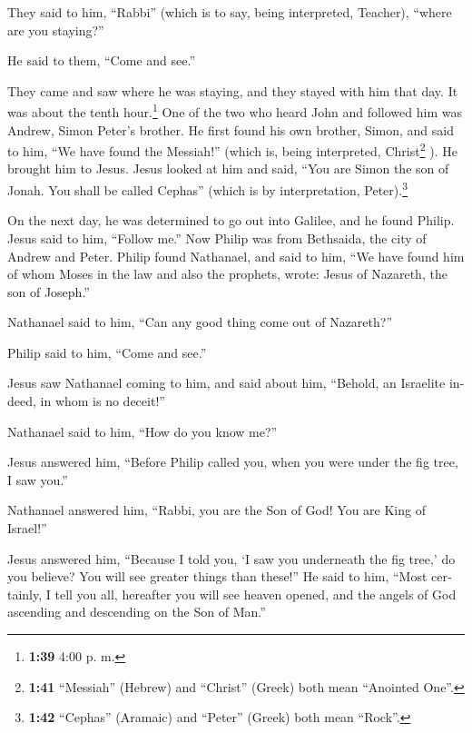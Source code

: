 \begin{paracol}{2}
\begin{otherlanguage}{english}
They said to him, ``Rabbi'' (which is to say, being interpreted,
Teacher), ``where are you staying?''

 He said to them, ``Come and see.''

They came and saw where he was staying, and they stayed with him that
day. It was about the tenth hour.\footnote{\textbf{1:39} 4:00 p. m.}
 One of the two who heard John and followed him was
Andrew, Simon Peter's brother.  He first found his own
brother, Simon, and said to him, ``We have found the Messiah!'' (which
is, being interpreted, Christ\footnote{\textbf{1:41} ``Messiah''
  (Hebrew) and ``Christ'' (Greek) both mean ``Anointed One''.} ).
 He brought him to Jesus. Jesus looked at him and said,
``You are Simon the son of Jonah. You shall be called Cephas'' (which is
by interpretation, Peter).\footnote{\textbf{1:42} ``Cephas'' (Aramaic)
  and ``Peter'' (Greek) both mean ``Rock''.}

 On the next day, he was determined to go out into
Galilee, and he found Philip. Jesus said to him, ``Follow me.''
 Now Philip was from Bethsaida, the city of Andrew and
Peter.  Philip found Nathanael, and said to him, ``We
have found him of whom Moses in the law and also the prophets, wrote:
Jesus of Nazareth, the son of Joseph.''

 Nathanael said to him, ``Can any good thing come out of
Nazareth?''

Philip said to him, ``Come and see.''

 Jesus saw Nathanael coming to him, and said about him,
``Behold, an Israelite indeed, in whom is no deceit!''

 Nathanael said to him, ``How do you know me?''

Jesus answered him, ``Before Philip called you, when you were under the
fig tree, I saw you.''

 Nathanael answered him, ``Rabbi, you are the Son of God!
You are King of Israel!''

 Jesus answered him, ``Because I told you, `I saw you
underneath the fig tree,' do you believe? You will see greater things
than these!''  He said to him, ``Most certainly, I tell
you all, hereafter you will see heaven opened, and the angels of God
ascending and descending on the Son of Man.''

\end{otherlanguage}


\end{paracol}
